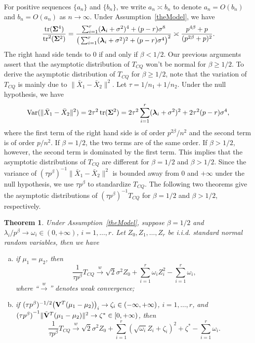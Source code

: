 \documentclass[3p]{elsarticle}
\DeclareMathOperator{\mytr}{tr}
\DeclareMathOperator{\myVar}{Var}
\newcommand{\bfsym}[1]{\ensuremath{\boldsymbol{#1}}}
\def\blambda {\bfsym {\lambda}}        \def\bLambda {\bfsym {\Lambda}}
\theoremstyle{plain}
\newtheorem{theorem}{\quad\quad Theorem}
\theoremstyle{definition}
\theoremstyle{remark}
\begin{document}
For positive sequences $\{a_n\}$ and $\{b_n\}$, we write $a_n\asymp b_n$ to denote $a_n=O(b_n)$ and $b_n=O(a_n)$ as $n\to \infty$.
Under Assumption~\ref{theModel}, we have
$$
\frac{\mytr(\bSigma^4)}{\mytr^2(\bSigma^2)}=
\frac{\sum_{i=1}^r (\blambda_i+\sigma^2)^4+(p-r)\sigma^8}{\big(\sum_{i=1}^r (\blambda_i+\sigma^2)^2+(p-r)\sigma^4\big)^2}\asymp \frac{p^{4\beta}+p}{(p^{2\beta}+p)^2}.
$$
The right hand side tends to $0$ if and only if $\beta<1/2$.
Our previous arguments assert that the asymptotic distribution of $T_{CQ}$ won't be normal for $\beta\geq 1/2$.
To derive the asymptotic distribution of $T_{CQ}$ for $\beta\geq 1/2$,
note that the variation of $T_{CQ}$ is mainly due to $\|\bar{X}_1-\bar{X}_2\|^2$.
Let $\tau=1/n_1+1/n_2$.
Under the null hypothesis, we have
$$
\myVar(\|\bar{X}_1-\bar{X}_2\|^2)=
2\tau^2 \mytr (\bSigma^2)=2\tau^2 \sum_{i=1}^r (\blambda_i+
\sigma^2)^2
+ 2\tau^2 (p-r)\sigma^4,
$$
where the first term of the right hand side is of order $p^{2\beta}/n^2$ and the second term is of order $p/n^2$.
If $\beta=1/2$, the two terms are of the same order. 
If $\beta>1/2$, however, the second term is dominated by the first term.
This implies that the asymptotic distributions of $T_{CQ}$ are different for $\beta=1/2$ and $\beta>1/2$.
Since the variance of $(\tau p^{\beta})^{-1}\|\bar{X}_1-\bar{X}_2\|^2$ is bounded away from $0$ and $+\infty$ under the null hypothesis, we use $\tau p^{\beta}$ to standardize $T_{CQ}$.
The following two theorems give the asymptotic distributions of $(\tau p^{\beta})^{-1}T_{CQ}$ for $\beta= 1/2$ and $\beta>1/2$, respectively.
\begin{theorem}\label{Chenstheory1}
 Under Assumption~\ref{theModel},
    suppose $\beta=1/2$ and $\lambda_i/p^\beta \to \omega_i\in(0,+\infty)$, $i=1,\ldots,r$.
    Let $Z_{0},Z_1,\ldots,Z_{r}$ be i.i.d. standard normal random variables,
     then we have
     \begin{enumerate}[(a)]
         \item
             if $\mu_1=\mu_2$, then
    $$
        \frac{1}{\tau p^{\beta}} T_{CQ}
        \xrightarrow{w}
\sqrt{2}\sigma^2 Z_0
+
        \sum_{i=1}^r \omega_i Z_i^2
            -
        \sum_{i=1}^r \omega_i,
    $$
             where ``$\xrightarrow{w}$'' denotes weak convergence;
         \item
             if $(\tau p^{\beta})^{-1/2}\big(\mathbf{V}^T (\mu_1-\mu_2)\big)_i\to \zeta_i\in(-\infty,+\infty)$, $i=1,\ldots,r$,
             and
    ${(\tau p^\beta)}^{-1}\|\tilde{\mathbf{V}}^T (\mu_1-\mu_2)\|^2\to \zeta^*\in [0,+\infty)$, then
    $$
        \frac{1}{\tau p^{\beta}} T_{CQ}
        \xrightarrow{w}
\sqrt{2}\sigma^2 Z_0+
        \sum_{i=1}^r (\sqrt{\omega_i} Z_i+\zeta_i)^2+
\zeta^*
        -
        \sum_{i=1}^r \omega_i.
    $$
     \end{enumerate}
\end{theorem}
\end{document}

